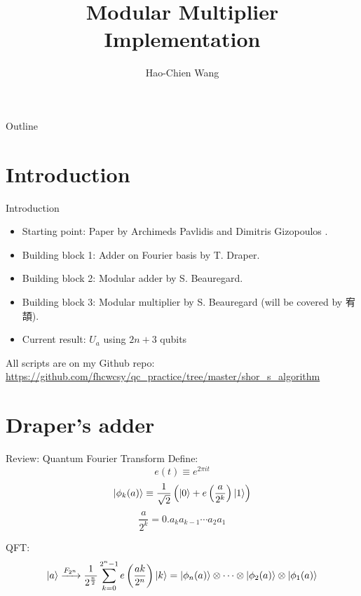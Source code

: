 \documentclass{beamer}
\title{Modular Multiplier Implementation}
\author{Hao-Chien Wang}
\institute[NTUPhys]{Department of Physics, National Taiwan University}
\begin{document}
\begin{frame}
	\titlepage
\end{frame}

\begin{frame}{Outline}
	\tableofcontents
\end{frame}

\section{Introduction}%
\label{sec:introduction}

\begin{frame}{Introduction}
	\begin{itemize}
		\item Starting point: Paper by Archimeds Pavlidis and Dimitris Gizopoulos
			\cite{pavlidis}.
		\item Building block 1: Adder on Fourier basis by T. Draper\cite{draper}.
		\item Building block 2: Modular adder by S. Beauregard\cite{beauregard}.
		\item Building block 3: Modular multiplier by S. Beauregard\cite{beauregard} (will be covered by 宥頡).
		\item Current result: $U_a$ using $2n+3$ qubits
	\end{itemize}
	All scripts are on my Github repo: \\
	\scriptsize{\url{https://github.com/fhcwcsy/qc_practice/tree/master/shor_s_algorithm}}
\end{frame}

\section{Draper's adder}%
\label{sec:draper_s_adder}

\begin{frame}{Review: Quantum Fourier Transform}
	Define:
	\begin{equation*}
		e(t) \equiv e^{2 \pi i t}
	\end{equation*}
	\begin{equation*}
		\ket{\phi_k (a)} \equiv \frac{1}{\sqrt{2}} \left( \ket{0} + e\left( 
		\frac{a}{2^k}\right) \ket{1} \right)
	\end{equation*}
	\begin{equation*}
		\frac{a}{2^k} = 0.a_k a_{k-1} \cdots a_2 a_1
	\end{equation*}
	
	QFT:
	\begin{equation*}
		\ket{a} \xrightarrow{F_{2^n}} \frac{1}{2^{\frac{n}{2}}} \sum_{k=0}^{2^n-1}
		e\left( \frac{ak}{2^n} \right)\ket{k} = \ket{\phi_n (a) } \otimes \cdots
		\otimes \ket{\phi_2 (a) } \otimes \ket{\phi_1 (a) }
	\end{equation*}

	
\end{frame}
\end{document}
